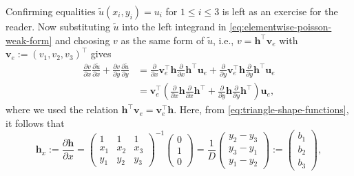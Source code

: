 {Confirming equalities $\widetilde u(x_i,y_i)=u_i$ for $1\le i\le3$ is left as an exercise for the reader.}
{Now substituting $\widetilde u$ into the left integrand in \eqref{eq:elementwise-poisson-weak-form} and choosing $v$ as the same form of $\widetilde u$, i.e., $v=\boldsymbol{h}^{\top}\boldsymbol{v}_e$ with $\boldsymbol{v}_e:=(v_1,v_2,v_3)^{\top}$ gives}
\[\begin{aligned}
\frac{\partial v}{\partial x}\frac{\partial\widetilde u}{\partial x}+\frac{\partial v}{\partial y}\frac{\partial\widetilde u}{\partial y}
&=\frac{\partial}{\partial x}\boldsymbol{v}_e^{\top}\boldsymbol{h}\frac{\partial}{\partial x}\boldsymbol{h}^{\top}\boldsymbol{u}_e+\frac{\partial}{\partial y}\boldsymbol{v}_e^{\top}\boldsymbol{h}\frac{\partial}{\partial y}\boldsymbol{h}^{\top}\boldsymbol{u}_e\\
&=\boldsymbol{v}_e^{\top}\left(\frac{\partial}{\partial x}\boldsymbol{h}\frac{\partial}{\partial x}\boldsymbol{h}^{\top}+\frac{\partial}{\partial y}\boldsymbol{h}\frac{\partial}{\partial y}\boldsymbol{h}^{\top}\right)\boldsymbol{u}_e,
\end{aligned}\]
{where we used the relation $\boldsymbol{h}^{\top}\boldsymbol{v}_e=\boldsymbol{v}_e^{\top}\boldsymbol{h}$. Here, from \eqref{eq:triangle-shape-functions}, it follows that}
\begin{equation}\label{eq:triangle-shape-x-derivative}
\boldsymbol{h}_x:=\frac{\partial\boldsymbol{h}}{\partial x}
=\begin{pmatrix}1&1&1\\x_1&x_2&x_3\\y_1&y_2&y_3\end{pmatrix}^{-1}\begin{pmatrix}0\\1\\0\end{pmatrix}
=\frac1D\begin{pmatrix}y_2-y_3\\y_3-y_1\\y_1-y_2\end{pmatrix}:=\begin{pmatrix}b_1\\b_2\\b_3\end{pmatrix},
\end{equation}
